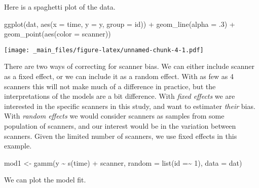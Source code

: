 \documentclass[
]{book}
\newenvironment{Shaded}{\begin{snugshade}}{\end{snugshade}}
\newcommand{\AttributeTok}[1]{\textcolor[rgb]{0.77,0.63,0.00}{#1}}
\newcommand{\DecValTok}[1]{\textcolor[rgb]{0.00,0.00,0.81}{#1}}
\newcommand{\FunctionTok}[1]{\textcolor[rgb]{0.00,0.00,0.00}{#1}}
\newcommand{\NormalTok}[1]{#1}
\newcommand{\OtherTok}[1]{\textcolor[rgb]{0.56,0.35,0.01}{#1}}
\newcommand{\SpecialCharTok}[1]{\textcolor[rgb]{0.00,0.00,0.00}{#1}}
\begin{document}
Here is a spaghetti plot of the data.

\begin{Shaded}
\begin{Highlighting}[]
\FunctionTok{ggplot}\NormalTok{(dat, }\FunctionTok{aes}\NormalTok{(}\AttributeTok{x =}\NormalTok{ time, }\AttributeTok{y =}\NormalTok{ y, }\AttributeTok{group =}\NormalTok{ id)) }\SpecialCharTok{+} 
  \FunctionTok{geom\_line}\NormalTok{(}\AttributeTok{alpha =}\NormalTok{ .}\DecValTok{3}\NormalTok{) }\SpecialCharTok{+} 
  \FunctionTok{geom\_point}\NormalTok{(}\FunctionTok{aes}\NormalTok{(}\AttributeTok{color =}\NormalTok{ scanner))}
\end{Highlighting}
\end{Shaded}

\texttt{[image: \_main\_files/figure-latex/unnamed-chunk-4-1.pdf]}

There are two ways of correcting for scanner bias. We can either include scanner as a fixed effect, or we can include it as a random effect. With as few as 4 scanners this will not make much of a difference in practice, but the interpretations of the models are a bit difference. With \emph{fixed effects} we are interested in the specific scanners in this study, and want to estimater \emph{their} bias. With \emph{random effects} we would consider scanners as samples from some population of scanners, and our interest would be in the variation between scanners. Given the limited number of scanners, we use fixed effects in this example.

\begin{Shaded}
\begin{Highlighting}[]
\NormalTok{mod1 }\OtherTok{\textless{}{-}} \FunctionTok{gamm}\NormalTok{(y }\SpecialCharTok{\textasciitilde{}} \FunctionTok{s}\NormalTok{(time) }\SpecialCharTok{+}\NormalTok{ scanner, }\AttributeTok{random =} \FunctionTok{list}\NormalTok{(}\AttributeTok{id =}\SpecialCharTok{\textasciitilde{}} \DecValTok{1}\NormalTok{), }\AttributeTok{data =}\NormalTok{ dat)}
\end{Highlighting}
\end{Shaded}

We can plot the model fit.

\begin{Shaded}
\end{Shaded}
\end{document}
